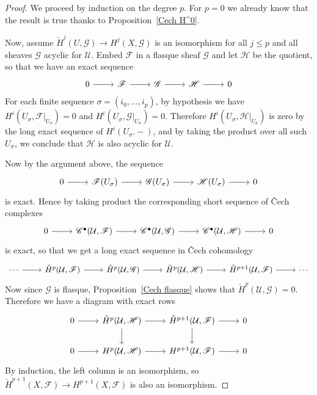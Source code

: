 \begin{proof}
We proceed by induction on the degree $p$. For $p=0$ we already know that the result is true thanks to Proposition~\ref{Cech H^0}.\par
Now, assume $\check{H}^j(U,\mathscr{G})\to H^j(X,\mathscr{G})$ is an isomorphism for all $j\leq p$ and all sheaves $\mathscr{G}$ acyclic for $\mathcal{U}$. Embed $\mathscr{F}$ in a flasque sheaf $\mathscr{G}$ and let $\mathscr{H}$ be the quotient, so that we have an exact sequence
\[\begin{tikzcd}
0\ar[r]&\mathscr{F}\ar[r]&\mathscr{G}\ar[r]&\mathscr{H}\ar[r]&0
\end{tikzcd}\]
For each finite sequence $\sigma=(i_0,\dots,i_p)$, by hypothesis  we have $H^i(U_\sigma,\mathscr{F}|_{U_\sigma})=0$ and $H^i(U_\sigma,\mathscr{G}|_{U_\sigma})=0$. Therefore $H^i(U_\sigma,\mathscr{H}|_{U_\sigma})$ is zero by the long exact sequence of $H^i(U_\sigma.-)$, and by taking the product over all such $U_\sigma$, we conclude that $\mathscr{H}$ is also acyclic for $\mathcal{U}$.\par
Now by the argument above, the sequence
\[\begin{tikzcd}
0\ar[r]&\mathscr{F}(U_\sigma)\ar[r]&\mathscr{G}(U_\sigma)\ar[r]&\mathscr{H}(U_\sigma)\ar[r]&0
\end{tikzcd}\]
is exact. Hence by taking product the corresponding short sequence of \v{C}ech complexes
\[\begin{tikzcd}
0\ar[r]&\mathscr{C}^\bullet(\mathcal{U},\mathscr{F})\ar[r]&\mathscr{C}^\bullet(\mathcal{U},\mathscr{G})\ar[r]&\mathscr{C}^\bullet(\mathcal{U},\mathscr{H})\ar[r]&0
\end{tikzcd}\]
is exact, so that we get a long exact sequence in \v{C}ech cohomology
\[\begin{tikzcd}
\cdots\ar[r]&\check{H}^{p}(\mathcal{U},\mathscr{F})\ar[r]&\check{H}^{p}(\mathcal{U},\mathscr{G})\ar[r]&\check{H}^{p}(\mathcal{U},\mathscr{H})\ar[r]&\check{H}^{p+1}(\mathcal{U},\mathscr{F})\ar[r]&\cdots
\end{tikzcd}\]
Now since $\mathscr{G}$ is flasque, Proposition~\ref{Cech flasque} shows that $\check{H}^p(\mathcal{U},\mathscr{G})=0$. Therefore we have a diagram with exact rows
\[\begin{tikzcd}
0\ar[r]&\check{H}^{p}(\mathcal{U},\mathscr{H})\ar[r]\ar[d]&\check{H}^{p+1}(\mathcal{U},\mathscr{F})\ar[r]\ar[d]&0\\
0\ar[r]&H^{p}(\mathcal{U},\mathscr{H})\ar[r]&H^{p+1}(\mathcal{U},\mathscr{F})\ar[r]&0
\end{tikzcd}\]
By induction, the left column is an isomorphism, so $\check{H}^{p+1}(X,\mathscr{F})\to H^{p+1}(X,\mathscr{F})$ is also an isomorphism.
\end{proof}
